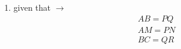 \begin{enumerate}[label=\thesection.\arabic*.,ref=\thesection.\theenumi]
	
\item 	given that $\to$
\begin{align}
AB = PQ\\
AM = PN\\
BC = QR	
\end{align}

%
\end{enumerate}
